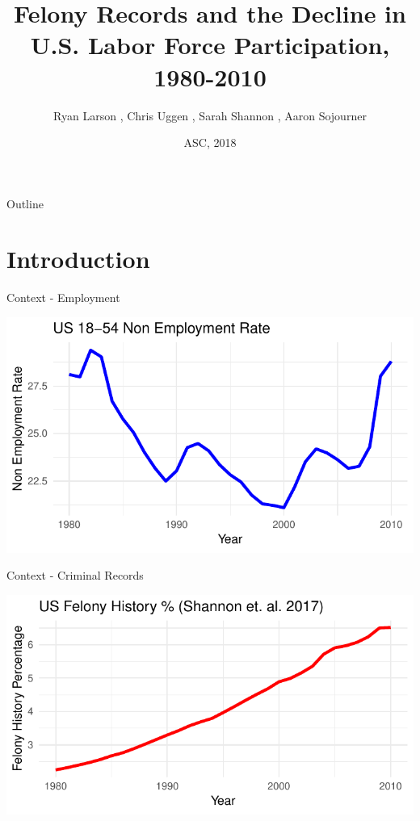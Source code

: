 \documentclass{beamer}\usepackage[]{graphicx}\usepackage[]{color}
\title[Felony Records and the U.S. Labor Force]{Felony Records and the Decline in U.S. Labor Force Participation, 1980-2010}
\subtitle{}
\author[Larson et. al.]{Ryan Larson \inst{1}, Chris Uggen \inst{1}, Sarah Shannon \inst{2}, Aaron Sojourner \inst{3}}
\institute [UMN, UGA] %
{
  \inst{1}
  Department of Sociology, 
  University of Minnesota\\
  \inst{2}
  Department of Sociology, 
  University of Georgia\\
  \inst{3}
  Carlson School of Management, 
  University of Minnesota
 
}
\date{ASC, 2018}
\makeatletter
\def\maxwidth{ %
  \ifdim\Gin@nat@width>\linewidth
    \linewidth
  \else
    \Gin@nat@width
  \fi
}
\newenvironment{knitrout}{}{} %
\makeatother
\begin{document}
\begin{frame}
  \titlepage
\end{frame}

\begin{frame}{Outline}
  \tableofcontents
\end{frame}

\section{Introduction}

\begin{frame}{Context - Employment}



\begin{knitrout}
\color{fgcolor}
\includegraphics[width=\maxwidth]{figure/unnamed-chunk-2-1} 

\end{knitrout}



\end{frame}

\begin{frame}{Context - Criminal Records}


\begin{knitrout}
\color{fgcolor}
\includegraphics[width=\maxwidth]{figure/unnamed-chunk-3-1} 

\end{knitrout}



\end{frame}
\end{document}
